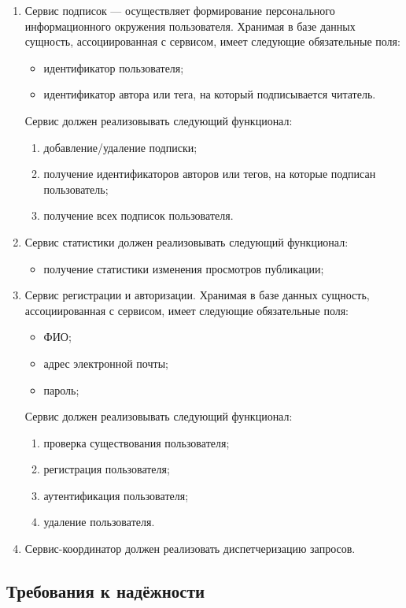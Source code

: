 \documentclass{bmstu-gost-7-32}
\begin{document}
\begin{enumerate}
	\item Сервис подписок — осуществляет формирование персонального информационного окружения пользователя.
	Хранимая в базе данных сущность, ассоциированная с сервисом, имеет следующие обязательные поля:
	\begin{itemize}
		\item идентификатор пользователя;
		\item идентификатор автора или тега, на который подписывается читатель.
	\end{itemize}
	Сервис должен реализовывать следующий функционал:
	\begin{enumerate}
		\item добавление/удаление подписки;
		\item получение идентификаторов авторов или тегов, на которые подписан пользователь;
		\item получение всех подписок пользователя.
	\end{enumerate}
	\item Сервис статистики должен реализовывать следующий функционал:
	\begin{itemize}
		\item получение статистики изменения просмотров публикации;
	\end{itemize}
	\item Сервис регистрации и авторизации.
	Хранимая в базе данных сущность, ассоциированная с сервисом, имеет следующие обязательные поля:
	\begin{itemize}
		\item ФИО;
		\item адрес электронной почты;
		\item пароль;
	\end{itemize}
	Сервис должен реализовывать следующий функционал:
	\begin{enumerate}
		\item проверка существования пользователя;
		\item регистрация пользователя;
		\item аутентификация пользователя;
		\item удаление пользователя.
	\end{enumerate}
	\item Сервис-координатор должен реализовать диспетчеризацию запросов.
\end{enumerate}

\subsection{Требования к надёжности}
\end{document}

